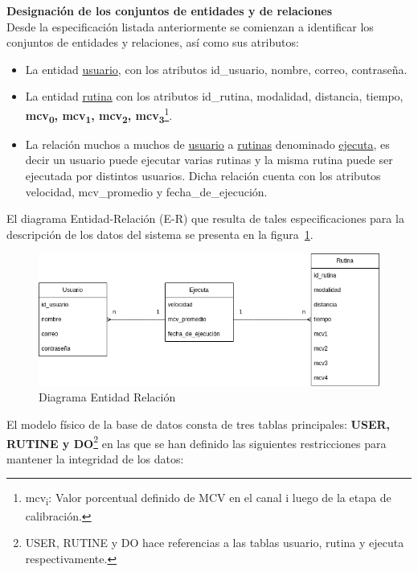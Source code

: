 \textbf{Designación de los conjuntos de entidades y de relaciones}\\
Desde la especificación listada anteriormente se comienzan a
identificar los conjuntos de entidades y relaciones, así como sus atributos:
\begin{itemize}
    \item La entidad \underline{usuario}, con los atributos id\_usuario, nombre, correo, contraseña.
    \item La entidad \underline{rutina} con los atributos id\_rutina, modalidad, distancia, tiempo, \textbf{mcv\textsubscript{0}, mcv\textsubscript{1}, mcv\textsubscript{2}, mcv\textsubscript{3}}\footnote{mcv\textsubscript{i}: Valor porcentual definido de MCV en el canal i luego de la etapa de calibración.}.
    \item La relación muchos a muchos de \underline{usuario} a \underline{rutinas} denominado \underline{ejecuta}, es decir un usuario puede ejecutar 
    varias rutinas y la misma rutina puede ser ejecutada por distintos usuarios. Dicha relación cuenta con los atributos velocidad, mcv\_promedio y fecha\_de\_ejecución. 
\end{itemize}
    
El diagrama Entidad-Relación (E-R) que resulta de tales especificaciones para la descripción de los datos del sistema se presenta en la figura~\ref{fig: diagram-er}.
\begin{figure}[ht]
    \centering
    \includegraphics[scale=0.48]{images/diagram-er.png}
    \caption{Diagrama Entidad Relación}
    \label{fig: diagram-er}
\end{figure}

El modelo físico de la base de datos consta de tres tablas principales: \textbf{USER, RUTINE y DO}\footnote{USER, RUTINE y DO hace referencias a las tablas usuario, rutina y ejecuta respectivamente.} en las que se han definido las siguientes restricciones para mantener la integridad de los datos:

